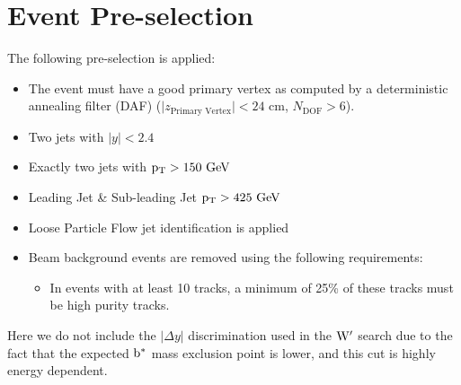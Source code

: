 

\section{Event Pre-selection}
\label{sec:bspre-selection}
The following pre-selection is applied:

\begin{itemize}
\item The event must have a good primary vertex as computed by a deterministic annealing filter (DAF)
($\vert z_\text{Primary Vertex}\vert < 24$ cm, $N_\text{DOF} > 6$).
\item Two jets with $|y| < 2.4$
\item Exactly two jets with $\mathrm{p_{T}} > 150~\mathrm{GeV}$
\item Leading Jet \& Sub-leading Jet $\mathrm{p_{T}} > 425~\mathrm{GeV}$
\item Loose Particle Flow jet identification \cite{jetid} is applied
\item Beam background events are removed using the following requirements:
        \begin{itemize}
        \item In events with at least 10 tracks, a minimum of 25\% of
          these tracks must be high purity tracks.
        \end{itemize}
\end{itemize}

Here we do not include the $|\Delta y|$ discrimination used in the $\mathrm{W}^{\prime}$ search due to the fact that the expected 
$\mathrm{b}^{*}$ mass exclusion point is lower, and this cut is highly energy dependent.  




